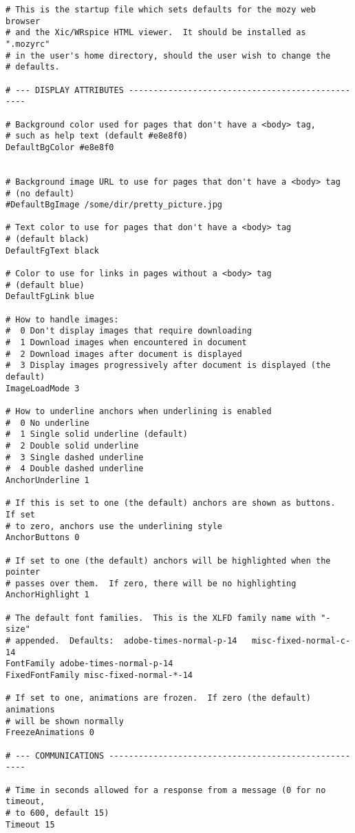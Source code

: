 \begin{verbatim}
# This is the startup file which sets defaults for the mozy web browser
# and the Xic/WRspice HTML viewer.  It should be installed as ".mozyrc"
# in the user's home directory, should the user wish to change the
# defaults.

# --- DISPLAY ATTRIBUTES -------------------------------------------------

# Background color used for pages that don't have a <body> tag,
# such as help text (default #e8e8f0)
DefaultBgColor #e8e8f0


# Background image URL to use for pages that don't have a <body> tag
# (no default)
#DefaultBgImage /some/dir/pretty_picture.jpg

# Text color to use for pages that don't have a <body> tag
# (default black)
DefaultFgText black

# Color to use for links in pages without a <body> tag
# (default blue)
DefaultFgLink blue

# How to handle images:
#  0 Don't display images that require downloading
#  1 Download images when encountered in document
#  2 Download images after document is displayed
#  3 Display images progressively after document is displayed (the default)
ImageLoadMode 3

# How to underline anchors when underlining is enabled
#  0 No underline
#  1 Single solid underline (default)
#  2 Double solid underline
#  3 Single dashed underline
#  4 Double dashed underline
AnchorUnderline 1

# If this is set to one (the default) anchors are shown as buttons.  If set
# to zero, anchors use the underlining style
AnchorButtons 0

# If set to one (the default) anchors will be highlighted when the pointer
# passes over them.  If zero, there will be no highlighting
AnchorHighlight 1

# The default font families.  This is the XLFD family name with "-size"
# appended.  Defaults:  adobe-times-normal-p-14   misc-fixed-normal-c-14
FontFamily adobe-times-normal-p-14
FixedFontFamily misc-fixed-normal-*-14

# If set to one, animations are frozen.  If zero (the default) animations
# will be shown normally
FreezeAnimations 0

# --- COMMUNICATIONS -----------------------------------------------------

# Time in seconds allowed for a response from a message (0 for no timeout,
# to 600, default 15)
Timeout 15


\end{verbatim}
